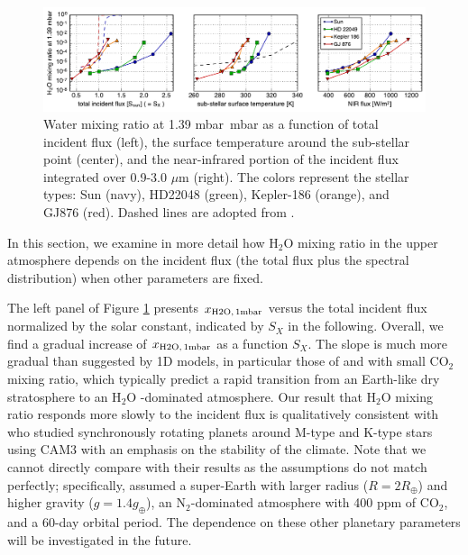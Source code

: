 \documentclass[11pt,numberedappendix,twocolappendix,]{emulateapj}
\def\water{H$_2$O }
\def\xwater{$x_{\rm H2O,\,1mbar}$ }
\def\preslevel{1.39 mbar\ }
\begin{document}
\begin{figure}[!tb]
    \begin{center}
    \includegraphics[width=\hsize]{fig/xH2O_3panels.pdf}
    \end{center}
\caption{Water mixing ratio at \preslevel mbar as a function of total incident flux (left), the surface temperature around the sub-stellar point (center), and the near-infrared portion of the incident flux integrated over 0.9-3.0 $\mu $m (right). The colors represent the stellar types: Sun (navy), HD22048 (green), Kepler-186 (orange), and GJ876 (red). Dashed lines are adopted from \citet{Kasting1993}. }                                                                                                             
\label{fig:xH2O_S0X}
\end{figure}

In this section, we examine in more detail how \water mixing ratio in the upper atmosphere depends on the incident flux (the total flux plus the spectral distribution) when other parameters are fixed. 

The left panel of Figure \ref{fig:xH2O_S0X} presents \xwater versus the total incident flux normalized by the solar constant, indicated by $S_X$ in the following. 
Overall, we find a gradual increase of \xwater as a function $S_X$. 
The slope is much more gradual than suggested by 1D models, in particular those  of \citet{Kasting1993} and \citet{Wordsworth2013} with small CO$_2$ mixing ratio, which typically predict a rapid transition from an Earth-like dry stratosphere to an \water-dominated atmosphere. 
Our result that \water mixing ratio responds more slowly to the incident flux is qualitatively consistent with \citet{Yang2013} who studied synchronously rotating planets around M-type and K-type stars using CAM3 with an emphasis on the stability of the climate. 
Note that we cannot directly compare with their results as the assumptions do not match perfectly; specifically, \cite{Yang2013} assumed a super-Earth with larger radius ($R=2R_{\oplus}$) and higher gravity ($g=1.4g_{\oplus}$), an N$_2$-dominated atmosphere with 400 ppm of CO$_2$, and a 60-day orbital period. 
The dependence on these other planetary parameters will be investigated in the future. 
\end{document}
